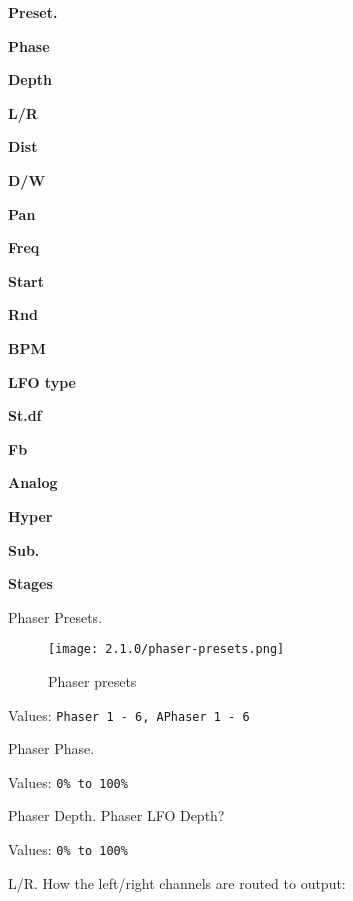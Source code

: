 
   \begin{enumber}
      \item \textbf{Preset.}
      \item \textbf{Phase}
      \item \textbf{Depth}
      \item \textbf{L/R}
      \item \textbf{Dist}
      \item \textbf{D/W}
      \item \textbf{Pan}
      \item \textbf{Freq}
      \item \textbf{Start}
      \item \textbf{Rnd}
      \item \textbf{BPM}
      \item \textbf{LFO type}
      \item \textbf{St.df}
      \item \textbf{Fb}
      \item \textbf{Analog}
      \item \textbf{Hyper}
      \item \textbf{Sub.}
      \item \textbf{Stages}

   \end{enumber}


\setcounter{ItemCounter}{0}

   Phaser Presets.

\begin{figure}[H]
   \centering
   \texttt{[image: 2.1.0/phaser-presets.png]}
   \caption{Phaser presets}
   \label{fig:phaser-presets}
\end{figure}
   Values: \texttt{Phaser 1 - 6, APhaser 1 - 6}

   Phaser Phase.

   Values: \texttt{0\% to 100\%}

   Phaser Depth. Phaser LFO Depth?

   Values: \texttt{0\% to 100\%}

   L/R. How the left/right channels are routed to output:

